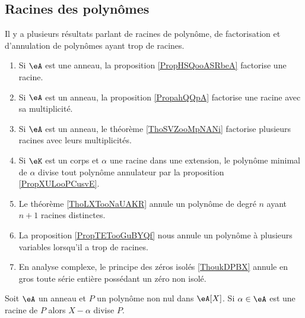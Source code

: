 \subsection{Racines des polynômes}

Il y a plusieurs résultats parlant de racines de polynôme, de factorisation et d'annulation de polynômes ayant trop de racines.
\begin{enumerate}
    \item
        Si \( \eA\) est une anneau, la proposition \ref{PropHSQooASRbeA} factorise une racine.
    \item
        Si \( \eA\) est un anneau, la proposition \ref{PropahQQpA} factorise une racine avec sa multiplicité.
    \item
        Si \( \eA\) est un anneau, le théorème \ref{ThoSVZooMpNANi} factorise plusieurs racines avec leurs multiplicités.
    \item
        Si \( \eK\) est un corps et \( \alpha\) une racine dans une extension, le polynôme minimal de \( \alpha\) divise tout polynôme annulateur par la proposition \ref{PropXULooPCusvE}.
    \item
        Le théorème \ref{ThoLXTooNaUAKR} annule un polynôme de degré \( n\) ayant \( n+1\) racines distinctes.
    \item
        La proposition \ref{PropTETooGuBYQf} nous annule un polynôme à plusieurs variables lorsqu'il a trop de racines.
    \item
        En analyse complexe, le principe des zéros isolés \ref{ThoukDPBX} annule en gros toute série entière possédant un zéro non isolé.
\end{enumerate}

\begin{proposition} \label{PropHSQooASRbeA}
    Soit \( \eA\) un anneau et \( P\) un polynôme non nul dans \( \eA[X]\). Si \( \alpha\in \eA\) est une racine de \( P\) alors \( X-\alpha\) divise \( P\).
\end{proposition}

